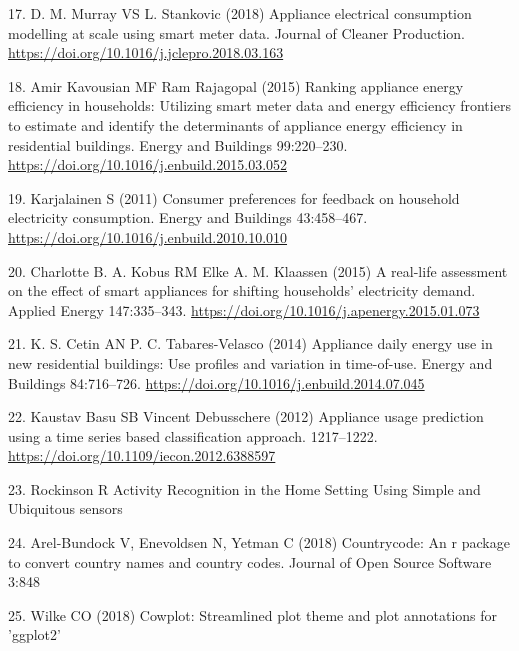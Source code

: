 \documentclass[11pt,]{article}
\begin{document}
\leavevmode\hypertarget{ref-d.m.murrayApplianceElectricalConsumption2018}{}%
17. D. M. Murray VS L. Stankovic (2018) Appliance electrical consumption
modelling at scale using smart meter data. Journal of Cleaner
Production. \url{https://doi.org/10.1016/j.jclepro.2018.03.163}

\leavevmode\hypertarget{ref-amirkavousianRankingApplianceEnergy2015}{}%
18. Amir Kavousian MF Ram Rajagopal (2015) Ranking appliance energy
efficiency in households: Utilizing smart meter data and energy
efficiency frontiers to estimate and identify the determinants of
appliance energy efficiency in residential buildings. Energy and
Buildings 99:220--230.
\url{https://doi.org/10.1016/j.enbuild.2015.03.052}

\leavevmode\hypertarget{ref-karjalainenConsumerPreferencesFeedback2011}{}%
19. Karjalainen S (2011) Consumer preferences for feedback on household
electricity consumption. Energy and Buildings 43:458--467.
\url{https://doi.org/10.1016/j.enbuild.2010.10.010}

\leavevmode\hypertarget{ref-charlotteb.a.kobusReallifeAssessmentEffect2015}{}%
20. Charlotte B. A. Kobus RM Elke A. M. Klaassen (2015) A real-life
assessment on the effect of smart appliances for shifting households'
electricity demand. Applied Energy 147:335--343.
\url{https://doi.org/10.1016/j.apenergy.2015.01.073}

\leavevmode\hypertarget{ref-k.s.cetinApplianceDailyEnergy2014}{}%
21. K. S. Cetin AN P. C. Tabares-Velasco (2014) Appliance daily energy
use in new residential buildings: Use profiles and variation in
time-of-use. Energy and Buildings 84:716--726.
\url{https://doi.org/10.1016/j.enbuild.2014.07.045}

\leavevmode\hypertarget{ref-kaustavbasuApplianceUsagePrediction2012}{}%
22. Kaustav Basu SB Vincent Debusschere (2012) Appliance usage
prediction using a time series based classification approach.
1217--1222. \url{https://doi.org/10.1109/iecon.2012.6388597}

\leavevmode\hypertarget{ref-rockinsonActivityRecognitionHome}{}%
23. Rockinson R Activity Recognition in the Home Setting Using Simple
and Ubiquitous sensors

\leavevmode\hypertarget{ref-countrycode}{}%
24. Arel-Bundock V, Enevoldsen N, Yetman C (2018) Countrycode: An r
package to convert country names and country codes. Journal of Open
Source Software 3:848

\leavevmode\hypertarget{ref-cowplot}{}%
25. Wilke CO (2018) Cowplot: Streamlined plot theme and plot annotations
for 'ggplot2'
\end{document}
